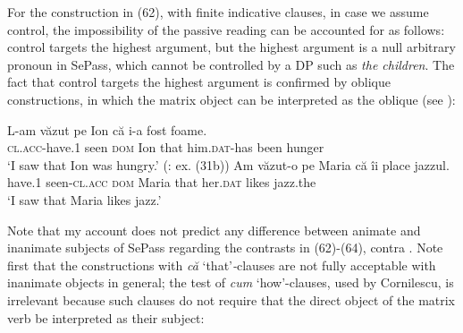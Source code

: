 \documentclass[output=paper]{langsci/langscibook}
\begin{document}
\judgewidth{*}
\ea%
    \label{ex:giurgea:65}
    \z
\z    

For the construction in (62), with finite indicative clauses, in case we assume control, the impossibility of the passive reading can be accounted for as follows: control targets the highest argument, but the highest argument is a null arbitrary pronoun in SePass, which cannot be controlled by a DP such as \textit{the children}. The fact that control targets the highest argument is confirmed by oblique  constructions, in which the matrix object can be interpreted as the oblique  (see \citealt{Alboiu2016}):

\ea%
    \label{ex:giurgea:66}
    \ea
    \gll L-am                văzut  pe Ion    că    i-a                 fost foame.   \\
         \textsc{cl.acc-}have.\textsc{1} seen   \textsc{dom} Ion that him.\textsc{dat-}has been hunger\\
    \glt ‘I saw that Ion was hungry.’ (\citealt{Alboiu2016}: ex. (31b))
    \ex
    \gll Am    văzut-o          pe     Maria că    îi           place jazzul.\\
          have.\textsc{1} seen{}-\textsc{cl.acc} \textsc{dom}  Maria that her.\textsc{dat} likes  jazz.the \\
    \glt ‘I saw that Maria likes jazz.’
    \z
\z    

Note that my account does not predict any difference between animate and inanimate subjects of SePass regarding the contrasts in (62)-(64), contra \citet{Cornilescu1998}. Note first that the constructions with \textit{că} ‘that’\textit{{}-}clauses are not fully acceptable with inanimate objects in general; the test of \textit{cum} ‘how’-clauses, used by Cornilescu, is irrelevant because such clauses do not require that the direct object of the matrix verb be interpreted as their subject:
\end{document}
